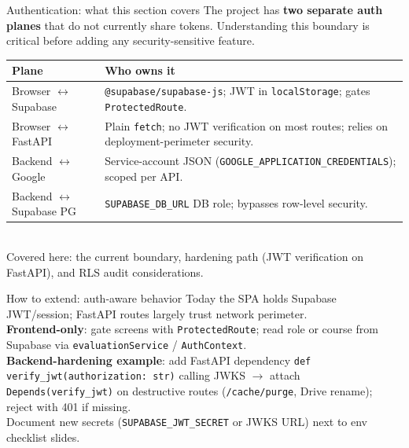 \documentclass[aspectratio=169]{beamer}
\begin{document}
\begin{frame}{Authentication: what this section covers}
  \small
  The project has \textbf{two separate auth planes} that do not currently share tokens.
  Understanding this boundary is critical before adding any security-sensitive feature.\\[0.4em]
  \begin{tabular}{@{}p{3.8cm}p{9.9cm}@{}}
    \toprule
    Plane & Who owns it \\
    \midrule
    Browser $\leftrightarrow$ Supabase & \texttt{@supabase/supabase-js}; JWT in \texttt{localStorage}; gates \texttt{ProtectedRoute}. \\
    Browser $\leftrightarrow$ FastAPI & Plain \texttt{fetch}; no JWT verification on most routes; relies on deployment-perimeter security. \\
    Backend $\leftrightarrow$ Google & Service-account JSON (\texttt{GOOGLE\_APPLICATION\_CREDENTIALS}); scoped per API. \\
    Backend $\leftrightarrow$ Supabase PG & \texttt{SUPABASE\_DB\_URL} DB role; bypasses row-level security. \\
    \bottomrule
  \end{tabular}
  \vspace{0.2em}\\
  \footnotesize Covered here: the current boundary, hardening path (JWT verification on FastAPI), and RLS audit considerations.
\end{frame}

\begin{frame}{How to extend: auth-aware behavior}
  \small
  Today the SPA holds Supabase JWT/session; FastAPI routes largely trust network perimeter.\\
  \textbf{Frontend-only}: gate screens with \texttt{ProtectedRoute}; read role or course from Supabase via \texttt{evaluationService} / \texttt{AuthContext}.\\
  \textbf{Backend-hardening example}: add FastAPI dependency \texttt{def verify\_jwt(authorization: str)} calling JWKS $\rightarrow$ attach \texttt{Depends(verify\_jwt)} on destructive routes (\texttt{/cache/purge}, Drive rename); reject with 401 if missing.\\
  Document new secrets (\texttt{SUPABASE\_JWT\_SECRET} or JWKS URL) next to env checklist slides.
\end{frame}
\end{document}
